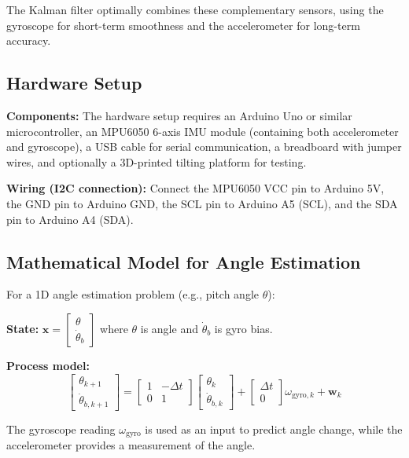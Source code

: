 The Kalman filter optimally combines these complementary sensors, using the gyroscope for short-term smoothness and the accelerometer for long-term accuracy.

\subsection{Hardware Setup}

\textbf{Components:} The hardware setup requires an Arduino Uno or similar microcontroller, an MPU6050 6-axis IMU module (containing both accelerometer and gyroscope), a USB cable for serial communication, a breadboard with jumper wires, and optionally a 3D-printed tilting platform for testing.

\textbf{Wiring (I2C connection):} Connect the MPU6050 VCC pin to Arduino 5V, the GND pin to Arduino GND, the SCL pin to Arduino A5 (SCL), and the SDA pin to Arduino A4 (SDA).

\subsection{Mathematical Model for Angle Estimation}

For a 1D angle estimation problem (e.g., pitch angle $\theta$):

\textbf{State:} $\mathbf{x} = \begin{bmatrix} \theta \\ \dot{\theta}_b \end{bmatrix}$ where $\theta$ is angle and $\dot{\theta}_b$ is gyro bias.

\textbf{Process model:}
\begin{equation}
\begin{bmatrix} \theta_{k+1} \\ \dot{\theta}_{b,k+1} \end{bmatrix} =
\begin{bmatrix} 1 & -\Delta t \\ 0 & 1 \end{bmatrix}
\begin{bmatrix} \theta_k \\ \dot{\theta}_{b,k} \end{bmatrix} +
\begin{bmatrix} \Delta t \\ 0 \end{bmatrix} \omega_{\text{gyro},k} +
\mathbf{w}_k
\end{equation}

The gyroscope reading $\omega_{\text{gyro}}$ is used as an input to predict angle change, while the accelerometer provides a measurement of the angle.

